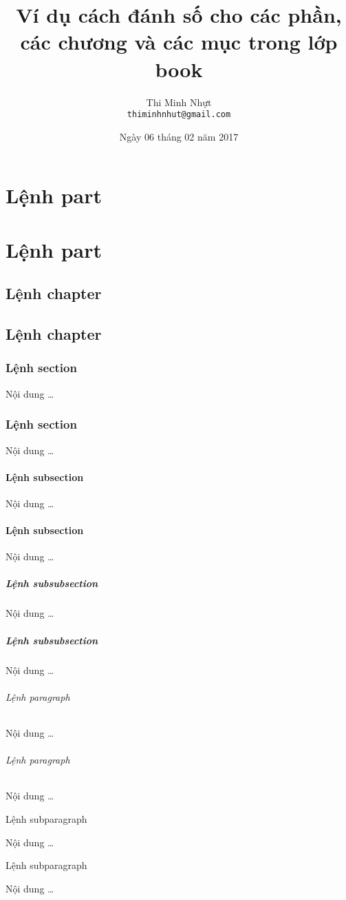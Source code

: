 \documentclass[12pt,a4paper]{report}
\title{\bfseries \huge Ví dụ cách đánh số cho các phần, các chương và các mục trong lớp book}
\author{\Large Thi Minh Nhựt \bigskip \\  \Large \texttt{thiminhnhut@gmail.com}}
\date{\Large Ngày 06 tháng 02 năm 2017}
\begin{document}
\maketitle
\tableofcontents
\thispagestyle{empty}
\newpage

\part{Lệnh part}
\part{Lệnh part}

\chapter{Lệnh chapter}
\chapter{Lệnh chapter}

\section{Lệnh section}
Nội dung \ldots
\section{Lệnh section}
Nội dung \ldots

\subsection{Lệnh subsection}
Nội dung \ldots
\subsection{Lệnh subsection}
Nội dung \ldots

\subsubsection{Lệnh subsubsection}
Nội dung \ldots
\subsubsection{Lệnh subsubsection}
Nội dung \ldots

\paragraph{Lệnh paragraph}
Nội dung \ldots
\paragraph{Lệnh paragraph}
Nội dung \ldots

\subparagraph{Lệnh subparagraph}
Nội dung \ldots
\subparagraph{Lệnh subparagraph}
Nội dung \ldots
\end{document}
